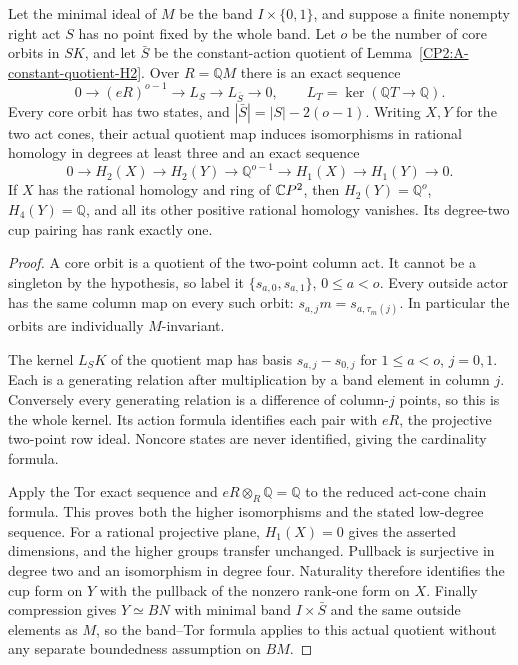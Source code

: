 \begin{lemma}
\label{CP2:A-two-column-orbit-kernel}
Let the minimal ideal of $M$ be the band $I\times\{0,1\}$,
and suppose a finite nonempty right act $S$ has no point
fixed by the whole band. Let $o$ be the number of core
orbits in $SK$, and let $\bar S$ be the constant-action
quotient of Lemma~\ref{CP2:A-constant-quotient-H2}.
Over $R=\mathbb QM$ there is an exact sequence
\[
 0\to(eR)^{o-1}\to L_S\to L_{\bar S}\to0,
 \qquad L_T=\ker(\mathbb QT\to\mathbb Q).
\]
Every core orbit has two states, and
$|\bar S|=|S|-2(o-1)$.
Writing $X,Y$ for the two act cones, their actual quotient
map induces isomorphisms in rational homology in degrees
at least three and an exact sequence
\[
 0\to H_2(X)\to H_2(Y)\to\mathbb Q^{o-1}
       \to H_1(X)\to H_1(Y)\to0.
\]
If $X$ has the rational homology and ring of $\mathbb{C}P^2$,
then $H_2(Y)=\mathbb Q^o$, $H_4(Y)=\mathbb Q$, and
all its other positive rational homology vanishes.
Its degree-two cup pairing has rank exactly one.
\end{lemma}
\begin{proof}
A core orbit is a quotient of the two-point column act.
It cannot be a singleton by the hypothesis, so label it
$\{s_{a,0},s_{a,1}\}$, $0\leq a<o$. Every outside actor
has the same column map on every such orbit:
$s_{a,j}m=s_{a,\tau_m(j)}$. In particular the orbits
are individually $M$-invariant.

The kernel $L_SK$ of the quotient map has basis
$s_{a,j}-s_{0,j}$ for $1\leq a<o$, $j=0,1$.
Each is a generating relation after multiplication
by a band element in column $j$. Conversely every
generating relation is a difference of column-$j$
points, so this is the whole kernel. Its action formula
identifies each pair with $eR$, the projective two-point
row ideal. Noncore states are never identified, giving
the cardinality formula.

Apply the Tor exact sequence and
$eR\otimes_R\mathbb Q=\mathbb Q$ to the reduced
act-cone chain formula. This proves both the higher
isomorphisms and the stated low-degree sequence.
For a rational projective plane, $H_1(X)=0$ gives
the asserted dimensions, and the higher groups
transfer unchanged. Pullback is surjective in degree
two and an isomorphism in degree four. Naturality
therefore identifies the cup form on $Y$ with the
pullback of the nonzero rank-one form on $X$.
Finally compression gives $Y\simeq BN$ with minimal
band $I\times\bar S$ and the same outside elements
as $M$, so the band--Tor formula applies to this
actual quotient without any separate boundedness
assumption on $BM$.
\end{proof}

